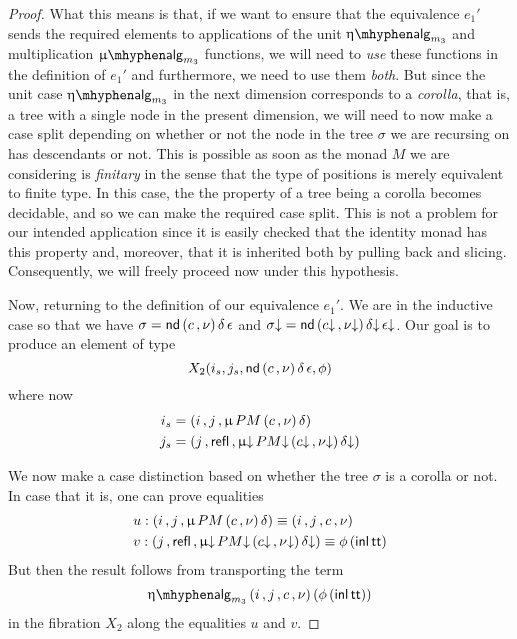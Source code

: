 \begin{proof}
  What this means is that, if we want to ensure that the equivalence
  $e_1'$ sends the required elements to applications of the unit
  $\upeta\alg_{m_3}$ and multiplication $\upmu\alg_{m_3}$ functions,
  we will need to \emph{use} these functions in the definition of
  $e_1'$ and furthermore, we need to use them \emph{both}.  But since
  the unit case $\upeta\alg_{m_3}$ in the next dimension corresponds
  to a \emph{corolla}, that is, a tree with a single node in the
  present dimension, we will need to now make a case split depending
  on whether or not the node in the tree $\sigma$ we are recursing on
  has descendants or not.  This is possible as soon as the monad $M$
  we are considering is \emph{finitary} in the sense that the type of
  positions is merely equivalent to finite type.  In this case, the
  the property of a tree being a corolla becomes decidable, and so we
  can make the required case split.  This is not a problem for our
  intended application since it is easily checked that the identity
  monad has this property and, moreover, that it is inherited both by
  pulling back and slicing.  Consequently, we will freely proceed now
  under this hypothesis.

  Now, returning to the definition of our equivalence $e_1'$.  We are
  in the inductive case so that we have
  $\sigma = \mathsf{nd}\, (c \,, \nu)\, \delta\, \epsilon$ and
  $\sigma{\downarrow} = \mathsf{nd}\, (c{\downarrow} \,, \nu{\downarrow})\, \delta{\downarrow}\, \epsilon{\downarrow}$. Our
  goal is to produce an element of type
  \[ X_2 (i_s , j_s , \mathsf{nd}\, (c \,, \nu)\, \delta\, \epsilon , \phi) \]
  where now
  \begin{align*}
    i_s &= (i \,, j \,, \upmu\, PM\, (c \,, \nu)\, \delta) \\
    j_s &= (j \,, \mathsf{refl} \,, \upmu{\downarrow}\, PM{\downarrow}\, (c{\downarrow} \,, \nu{\downarrow})\, \delta{\downarrow}) 
  \end{align*}
  
  We now make a case distinction based on whether the tree $\sigma$ is
  a corolla or not.  In case that it is, one can prove equalities
  \begin{align*}
    &u : (i \,, j \,, \upmu\, PM\, (c \,, \nu)\, \delta) \equiv (i \,, j \,, c \,, \nu) \\
    &v : (j \,, \mathsf{refl} \,, \upmu{\downarrow}\, PM{\downarrow}\, (c{\downarrow} \,, \nu{\downarrow})\, \delta{\downarrow}) \equiv \phi\, (\mathsf{inl}\, \mathsf{tt}) 
  \end{align*}
  But then the result follows from transporting the term
  \[ \upeta\alg_{m_3}\, (i \,, j \,, c \,, \nu)\, (\phi\, (\inl \ttt)) \]
  in the fibration $X_2$ along the equalities $u$ and $v$.


\end{proof}
